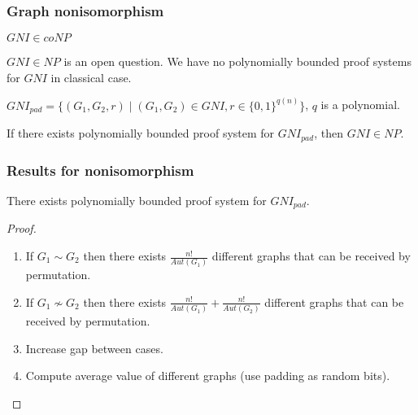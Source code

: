 \begin{frame}
    \frametitle{Graph nonisomorphism}

    $GNI \in coNP$
    
    $GNI \in NP$ is an open question. We have no polynomially bounded proof systems
    for $GNI$ in classical case.


    \begin{definition}
        $GNI_{pad} = \{(G_1, G_2, r) \mid (G_1, G_2) \in GNI,
        r \in \{0, 1\}^{q(n)}\}$, $q$ is a polynomial.
    \end{definition}

    \begin{lemma}
        If there exists polynomially bounded proof system for
        $GNI_{pad}$, then $GNI \in NP$.
    \end{lemma}
\end{frame}

\begin{frame}
    \frametitle{Results for nonisomorphism}

    \begin{theorem}
        There exists polynomially bounded proof system for $GNI_{pad}$.
    \end{theorem}

    \begin{proof}
        \begin{enumerate}
	        \item If $G_1 \sim G_2$ then there exists $\frac{n!}{Aut(G_1)}$ different
		        graphs that can be received by permutation.
            \item If $G_1 \nsim G_2$ then there exists $\frac{n!}{Aut(G_1)} +
		        \frac{n!}{Aut(G_2)}$ different graphs that can be received by permutation.
            \item Increase gap between cases.
        	\item Compute average value of different graphs (use padding as random bits).
        \end{enumerate}
    \end{proof}
\end{frame}